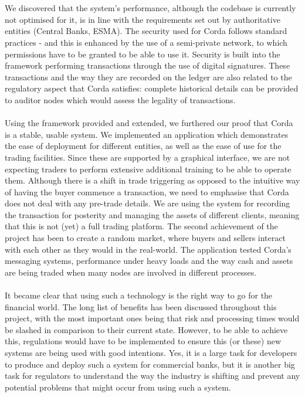 \documentclass[12pt,twoside]{article}
\begin{document}
\\ \\
We discovered that the system's performance, although the codebase is currently not optimised for it, is in line with the requirements set out by authoritative entities (Central Banks, ESMA). The security used for Corda follows standard practices - and this is enhanced by the use of a semi-private network, to which permissions have to be granted to be able to use it. Security is built into the framework performing transactions through the use of digital signatures. These transactions and the way they are recorded on the ledger are also related to the regulatory aspect that Corda satisfies: complete historical details can be provided to auditor nodes which would assess the legality of transactions.
\\ \\
Using the framework provided and extended, we furthered our proof that Corda is a stable, usable system. We implemented an application which demonstrates the ease of deployment for different entities, as well as the ease of use for the trading facilities. Since these are supported by a graphical interface, we are not expecting traders to perform extensive additional training to be able to operate them. Although there is a shift in trade triggering as opposed to the intuitive way of having the buyer commence a transaction, we need to emphasise that Corda does not deal with any pre-trade details. We are using the system for recording the transaction for posterity and managing the assets of different clients, meaning that this is not (yet) a full trading platform. The second achievement of the project has been to create a random market, where buyers and sellers interact with each other as they would in the real-world. The application tested Corda's messaging systems, performance under heavy loads and the way cash and assets are being traded when many nodes are involved in different processes.
\\ \\
It became clear that using such a technology is the right way to go for the financial world. The long list of benefits has been discussed throughout this project, with the most important ones being that risk and processing times would be slashed in comparison to their current state. However, to be able to achieve this, regulations would have to be implemented to ensure this (or these) new systems are being used with good intentions. Yes, it is a large task for developers to produce and deploy such a system for commercial banks, but it is another big task for regulators to understand the way the industry is shifting and prevent any potential problems that might occur from using such a system.
\end{document}
